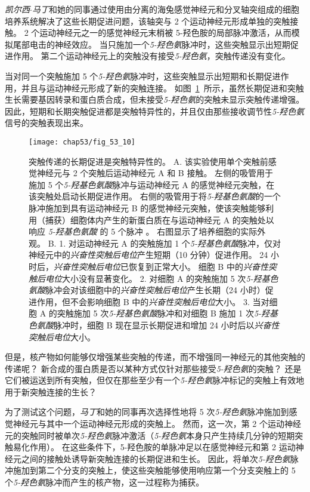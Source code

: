 \textit{凯尔西$\cdot$马丁}和她的同事通过使用由分离的海兔感觉神经元和分叉轴突组成的细胞培养系统解决了这些长期促进问题，该轴突与 2 个运动神经元形成单独的突触接触。
2 个运动神经元之一的感觉神经元末梢被 5-羟色胺的局部脉冲激活，从而模拟尾部电击的神经效应。
当只施加一个\textit{5-羟色氨}脉冲时，这些突触显示出短期促进作用。
第二个运动神经元上的突触没有接受\textit{5-羟色氨}，突触传递没有变化。


当对同一个突触施加 5 个\textit{5-羟色氨}脉冲时，这些突触显示出短期和长期促进作用，并且与运动神经元形成了新的突触连接。
如图~\ref{fig:53_10}~所示，虽然长期促进和突触生长需要基因转录和蛋白质合成，但未接受\textit{5-羟色氨}的突触未显示突触传递增强。
因此，短期和长期突触促进都是突触特异性的，并且仅由那些接收调节性\textit{5-羟色氨}信号的突触表现出来。


\begin{figure}[htbp]
	\centering
	\texttt{[image: chap53/fig\_53\_10]}
	\caption{突触传递的长期促进是突触特异性的\cite{martin1997synapse}。
		A. 该实验使用单个突触前感觉神经元与 2 个突触后运动神经元 A 和 B 接触。
		左侧的吸管用于施加 5 个\textit{5-羟基色氨酸}脉冲与运动神经元 A 的感觉神经元突触，在该突触处启动长期促进作用。
		右侧的吸管用于将\textit{5-羟基色氨酸}的一个脉冲施加到具有运动神经元 B 的感觉神经元突触，使该突触能够利用（捕获）细胞体内产生的新蛋白质在与运动神经元 A 的突触处以响应 \textit{5-羟基色氨酸} 的 5 个脉冲 。
		右图显示了培养细胞的实际外观。
		B. 1. 对运动神经元 A 的突触施加 1 个\textit{5-羟基色氨酸}脉冲，仅对神经元中的\textit{兴奋性突触后电位}产生短期（10 分钟）促进作用。
		24 小时后，\textit{兴奋性突触后电位}已恢复到正常大小。
		细胞 B 中的\textit{兴奋性突触后电位}大小没有显著变化。
		2. 对细胞 A 的突触施加 5 次\textit{5-羟基色氨酸}脉冲会对该细胞中的\textit{兴奋性突触后电位}产生长期（24 小时）促进作用，但不会影响细胞 B 中的\textit{兴奋性突触后电位}大小。
		3. 当对细胞 A 的突触施加 5 次\textit{5-羟基色氨酸}脉冲和对细胞 B 施加 1 次\textit{5-羟基色氨酸}脉冲时，细胞 B 现在显示长期促进和增加 24 小时后以\textit{兴奋性突触后电位}大小。}
	\label{fig:53_10}
\end{figure}


但是，核产物如何能够仅增强某些突触的传递，而不增强同一神经元的其他突触的传递呢？
新合成的蛋白质是否以某种方式仅针对那些接受\textit{5-羟色氨}的突触？
还是它们被运送到所有突触，但仅在那些至少有一个\textit{5-羟色氨}脉冲标记的突触上有效地用于新突触连接的生长？


为了测试这个问题，\textit{马丁}和她的同事再次选择性地将 5 次\textit{5-羟色氨}脉冲施加到感觉神经元与其中一个运动神经元形成的突触上。
然而，这一次，第 2 个运动神经元的突触同时被单次\textit{5-羟色氨}脉冲激活（\textit{5-羟色氨}本身只产生持续几分钟的短期突触易化作用）。
在这些条件下，5-羟色胺的单脉冲足以在感觉神经元和第 2 运动神经元之间的接触处诱导新突触连接的长期促进和生长。
因此，将单次\textit{5-羟色氨}脉冲施加到第二个分支的突触上，使这些突触能够使用响应第一个分支突触上的 5 个\textit{5-羟色氨}脉冲而产生的核产物，这一过程称为捕获。


